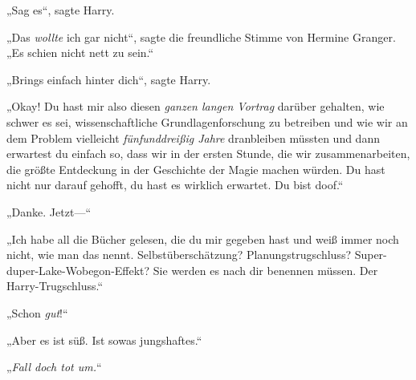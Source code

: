 „Sag es“, sagte Harry.

„Das \emph{wollte} ich gar nicht“, sagte die freundliche Stimme von Hermine Granger. „Es schien nicht nett zu sein.“

„Brings einfach hinter dich“, sagte Harry.

„Okay! Du hast mir also diesen \emph{ganzen langen Vortrag} darüber gehalten, wie schwer es sei, wissenschaftliche Grundlagenforschung zu betreiben und wie wir an dem Problem vielleicht \emph{fünfunddreißig Jahre} dranbleiben müssten und dann erwartest du einfach so, dass wir in der ersten Stunde, die wir zusammenarbeiten, die größte Entdeckung in der Geschichte der Magie machen würden. Du hast nicht nur darauf gehofft, du hast es wirklich erwartet. Du bist doof.“

„Danke. Jetzt—“

„Ich habe all die Bücher gelesen, die du mir gegeben hast und weiß immer noch nicht, wie man das nennt. Selbstüberschätzung? Planungstrugschluss? Super-duper-Lake-Wobegon-Effekt? Sie werden es nach dir benennen müssen. Der Harry-Trugschluss.“%

„Schon \emph{gut}!“

„Aber es ist süß. Ist sowas jungshaftes.“

„\emph{Fall doch tot um.}“

